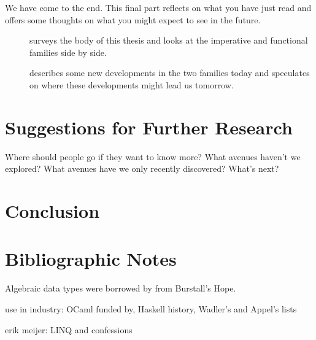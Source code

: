 \label{epilogue:epilogue}
We have come to the end. This final part reflects on what you have just read and offers some thoughts on what you might expect to see in the future.

\begin{description}
\item[] surveys the body of this thesis and looks at the imperative and functional families side by side.

\item[] describes some new developments in the two families today and speculates on where these developments might lead us tomorrow.

\end{description}





\section*{Suggestions for Further Research}
Where should people go if they want to know more? What avenues haven't we explored? What avenues have we only recently discovered? What's next?

\section*{Conclusion}\label{conclusion:conclusion}

\section*{Bibliographic Notes}
Algebraic data types were borrowed by \ML from Burstall's Hope.

use in industry: OCaml funded by, Haskell history, Wadler's and Appel's lists

erik meijer: LINQ and confessions



    \clearscrheadings
    \setheadsepline{0pt}
        {\relax}%
        {\renewcommand{\chaptermark}[1]{\markboth{\spacedlowsmallcaps{#1}}{}}}
    \renewcommand{\sectionmark}[1]{\markright{\thesection\ \spacedlowsmallcaps{#1}}}
    \lehead{\mbox{\llap{\small\thepage\kern2em}\headmark\hfil}}
    \rohead{\mbox{\hfil{\headmark}\rlap{\small\kern2em\thepage}}}
    \renewcommand{\headfont}{\small}  
